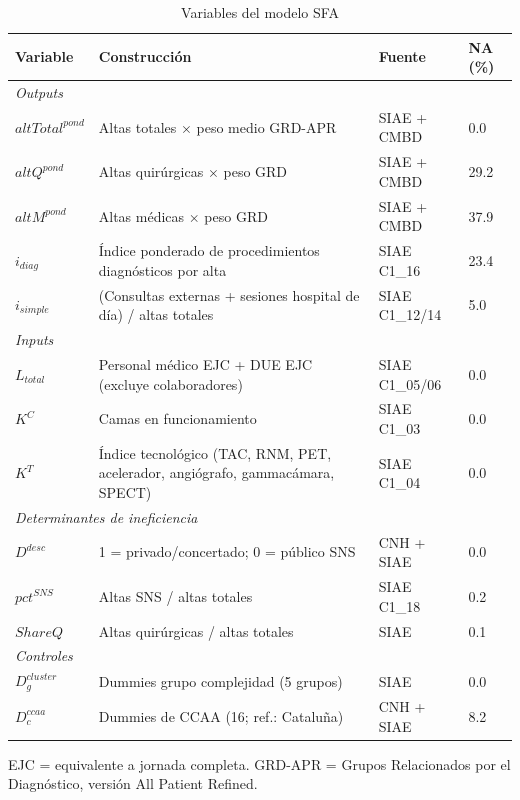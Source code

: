 \begin{table}[htbp]
\centering
\caption{Variables del modelo SFA}
\label{tab:variables}
\begin{threeparttable}
\small
\begin{tabular}{p{2.5cm}p{5cm}p{2.5cm}p{1.5cm}}
\toprule
\textbf{Variable} & \textbf{Construcción} &
\textbf{Fuente} & \textbf{NA (\%)} \\
\midrule
\multicolumn{4}{l}{\textit{Outputs}} \\
$altTotal^{pond}$ & Altas totales $\times$ peso medio GRD-APR & SIAE + CMBD & 0.0 \\
$altQ^{pond}$ & Altas quirúrgicas $\times$ peso GRD & SIAE + CMBD & 29.2 \\
$altM^{pond}$ & Altas médicas $\times$ peso GRD & SIAE + CMBD & 37.9 \\
$i_{diag}$ & Índice ponderado de procedimientos diagnósticos por alta & SIAE C1\_16 & 23.4 \\
$i_{simple}$ & (Consultas externas + sesiones hospital de día) / altas totales & SIAE C1\_12/14 & 5.0 \\[4pt]
\multicolumn{4}{l}{\textit{Inputs}} \\
$L_{total}$ & Personal médico EJC + DUE EJC (excluye colaboradores) & SIAE C1\_05/06 & 0.0 \\
$K^C$ & Camas en funcionamiento & SIAE C1\_03 & 0.0 \\
$K^T$ & Índice tecnológico (TAC, RNM, PET, acelerador, angiógrafo, gammacámara, SPECT) & SIAE C1\_04 & 0.0 \\[4pt]
\multicolumn{4}{l}{\textit{Determinantes de ineficiencia}} \\
$D^{desc}$ & 1 = privado/concertado; 0 = público SNS & CNH + SIAE & 0.0 \\
$pct^{SNS}$ & Altas SNS / altas totales & SIAE C1\_18 & 0.2 \\
$ShareQ$ & Altas quirúrgicas / altas totales & SIAE & 0.1 \\[4pt]
\multicolumn{4}{l}{\textit{Controles}} \\
$D^{cluster}_g$ & Dummies grupo complejidad (5 grupos) & SIAE & 0.0 \\
$D^{ccaa}_c$ & Dummies de CCAA (16; ref.: Cataluña) & CNH + SIAE & 8.2 \\
\bottomrule
\end{tabular}
\begin{tablenotes}
  \small
  \item EJC = equivalente a jornada completa. GRD-APR = Grupos Relacionados por el Diagnóstico, versión All Patient Refined.
\end{tablenotes}
\end{threeparttable}
\end{table}

